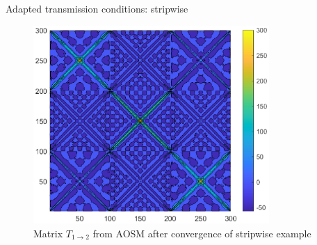 \documentclass{beamer}
\begin{document}
\begin{frame}{Adapted transmission conditions: stripwise}
\begin{figure}
	\centering
	\includegraphics[width=0.8\textwidth]{AOSM/PLOT_RedBlack_T_Seminar3.eps}
	\caption{Matrix $T_{1 \to 2}$ from AOSM after convergence of stripwise example}
\end{figure}
\end{frame}
\end{document}
